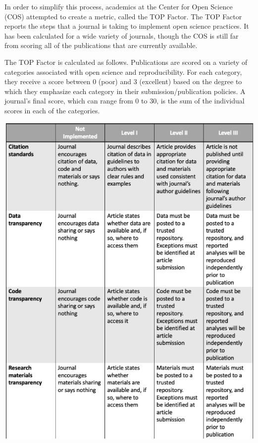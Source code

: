 \documentclass[12pt,twoside]{reedthesis}
\begin{document}
In order to simplify this process, academics at the Center for Open
Science (COS) attempted to create a metric, called the TOP Factor. The
TOP Factor reports the steps that a journal is taking to implement open
science practices. It has been calculated for a wide variety of
journals, though the COS is still far from scoring all of the
publications that are currently available.

The TOP Factor is calculated as follows. Publications are scored on a
variety of categories associated with open science and reproducibility.
For each category, they receive a score between 0 (poor) and 3
(excellent) based on the degree to which they emphasize each category in
their submission/publication policies. A journal's final score, which
can range from 0 to 30, is the sum of the individual scores in each of
the categories.
\begin{center}\includegraphics[width=1\linewidth]{figure/top-1} \end{center}
\end{document}
